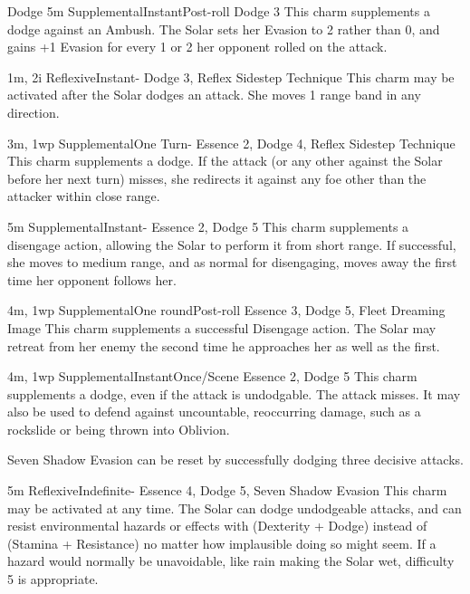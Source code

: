\begin{Ability}{Dodge}
  {5m}
  {Supplemental}{Instant}{Post-roll}
  {Dodge 3}
  This charm supplements a dodge against an Ambush. The Solar sets her Evasion to 2 rather than 0, and gains +1 Evasion for every 1 or 2 her opponent rolled on the attack.

  {1m, 2i}
  {Reflexive}{Instant}{-}
  {Dodge 3, Reflex Sidestep Technique}
  This charm may be activated after the Solar dodges an attack. She moves 1 range band in any direction.

  {3m, 1wp}
  {Supplemental}{One Turn}{-}
  {Essence 2, Dodge 4, Reflex Sidestep Technique}
  This charm supplements a dodge. If the attack (or any other against the Solar before her next turn) misses, she redirects it against any foe other than the attacker within close range.

  {5m}
  {Supplemental}{Instant}{-}
  {Essence 2, Dodge 5}
  This charm supplements a disengage action, allowing the Solar to perform it from short range. If successful, she moves to medium range, and as normal for disengaging, moves away the first time her opponent follows her.

  {4m, 1wp}
  {Supplemental}{One round}{Post-roll}
  {Essence 3, Dodge 5, Fleet Dreaming Image}
  This charm supplements a successful Disengage action. The Solar may retreat from her enemy the second time he approaches her as well as the first.

  {4m, 1wp}
  {Supplemental}{Instant}{Once/Scene}
  {Essence 2, Dodge 5}
  This charm supplements a dodge, even if the attack is undodgable. The attack misses. It may also be used to defend against uncountable, reoccurring damage, such as a rockslide or being thrown into Oblivion.

  Seven Shadow Evasion can be reset by successfully dodging three decisive attacks.

  {5m}
  {Reflexive}{Indefinite}{-}
  {Essence 4, Dodge 5, Seven Shadow Evasion}
  This charm may be activated at any time. The Solar can dodge undodgeable attacks, and can resist environmental hazards or effects with (Dexterity + Dodge) instead of (Stamina + Resistance) no matter how implausible doing so might seem. If a hazard would normally be unavoidable, like rain making the Solar wet, difficulty 5 is appropriate.


\end{Ability}
